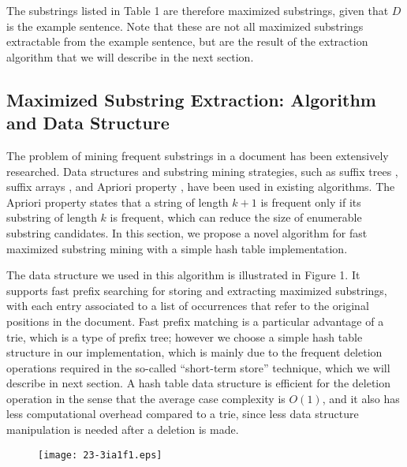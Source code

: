 \documentclass[english]{jnlp_1.4}
\begin{document}
The substrings listed in Table 1 are therefore maximized substrings, given that $D$ is the example sentence. Note that these are not all maximized substrings extractable from the example sentence, but are the result of the extraction algorithm that we will describe in the next section. 


\subsection{Maximized Substring Extraction: Algorithm and Data Structure}

The problem of mining frequent substrings in a document has been extensively researched. Data structures and substring mining strategies, such as suffix trees \cite{nelson1996fast}, suffix arrays \cite{yamamoto2001using,fischer2005fast}, and Apriori property \cite{agrawal1994fast}, have been used in existing algorithms. The Apriori property states that a string of length $k+1$ is frequent only if its substring of length $k$ is frequent, which can reduce the size of enumerable substring candidates. In this section, we propose a novel algorithm for fast maximized substring mining with a simple hash table implementation.

The data structure we used in this algorithm is illustrated in Figure 1. It supports fast prefix searching for storing and extracting maximized substrings, with each entry associated to a list of occurrences that refer to the original positions in the document. Fast prefix matching is a particular advantage of a trie, which is a type of prefix tree; however we choose a simple hash table structure in our implementation, which is mainly due to the frequent deletion operations required in the so-called ``short-term store'' technique, which we will describe in next section. A hash table data structure is efficient for the deletion operation in the sense that the average case complexity is $O(1)$, and it also has less computational overhead compared to a trie, since less data structure manipulation is needed after a deletion is made.

\begin{figure}[b]
\begin{center}
\texttt{[image: 23-3ia1f1.eps]}
\end{center}
\end{figure}
\end{document}
